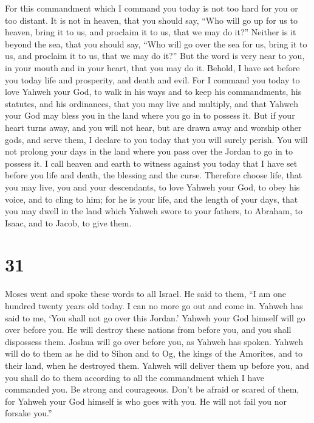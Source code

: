  For this commandment which I command you today is not
too hard for you or too distant.  It is not in heaven,
that you should say, ``Who will go up for us to heaven, bring it to us,
and proclaim it to us, that we may do it?''  Neither is
it beyond the sea, that you should say, ``Who will go over the sea for
us, bring it to us, and proclaim it to us, that we may do it?''
 But the word is very near to you, in your mouth and in
your heart, that you may do it.  Behold, I have set
before you today life and prosperity, and death and evil.
 For I command you today to love Yahweh your God, to walk
in his ways and to keep his commandments, his statutes, and his
ordinances, that you may live and multiply, and that Yahweh your God may
bless you in the land where you go in to possess it.  But
if your heart turns away, and you will not hear, but are drawn away and
worship other gods, and serve them,  I declare to you
today that you will surely perish. You will not prolong your days in the
land where you pass over the Jordan to go in to possess it.
 I call heaven and earth to witness against you today
that I have set before you life and death, the blessing and the curse.
Therefore choose life, that you may live, you and your descendants,
 to love Yahweh your God, to obey his voice, and to cling
to him; for he is your life, and the length of your days, that you may
dwell in the land which Yahweh swore to your fathers, to Abraham, to
Isaac, and to Jacob, to give them.

\hypertarget{section-30}{%
\section{31}\label{section-30}}

 Moses went and spoke these words to all Israel.
 He said to them, ``I am one hundred twenty years old
today. I can no more go out and come in. Yahweh has said to me, `You
shall not go over this Jordan.'  Yahweh your God himself
will go over before you. He will destroy these nations from before you,
and you shall dispossess them. Joshua will go over before you, as Yahweh
has spoken.  Yahweh will do to them as he did to Sihon and
to Og, the kings of the Amorites, and to their land, when he destroyed
them.  Yahweh will deliver them up before you, and you
shall do to them according to all the commandment which I have commanded
you.  Be strong and courageous. Don't be afraid or scared
of them, for Yahweh your God himself is who goes with you. He will not
fail you nor forsake you.''

